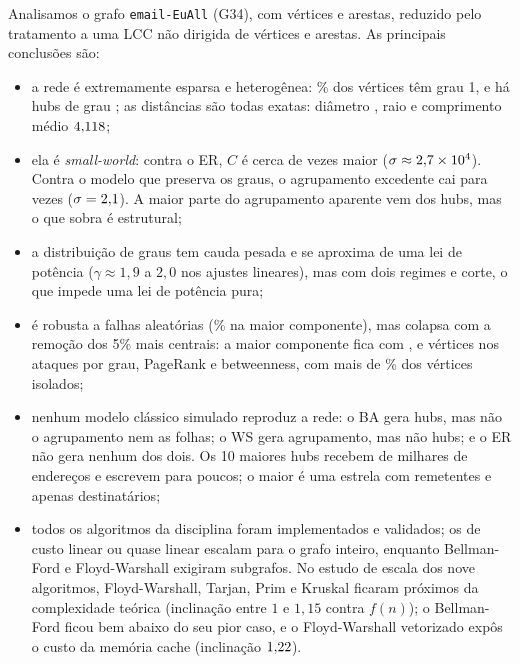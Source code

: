 \documentclass[sigconf]{webmedia}
\begin{document}
Analisamos o grafo \texttt{email-EuAll} (G34), com \nVBruto{} vértices e \nEBruto{} arestas,
reduzido pelo tratamento a uma LCC não dirigida de \nVLcc{} vértices e \nELcc{} arestas.
As principais conclusões são:
\begin{itemize}
  \item a rede é extremamente esparsa e heterogênea: \pctFolhas\% dos vértices têm grau 1,
  e há hubs de grau \grauMax; as distâncias são todas exatas: diâmetro \diametro, raio
  \raio{} e comprimento médio $4{,}118$;
  \item ela é \emph{small-world}: contra o ER, $C$ é cerca de \CsobreCr{} vezes maior
  ($\sigma\approx2{,}7\times10^{4}$). Contra o modelo que preserva os graus, o agrupamento
  excedente cai para \CsobreCconf{} vezes ($\sigma=2{,}1$). A maior parte do
  agrupamento aparente vem dos hubs, mas o que sobra é estrutural;
  \item a distribuição de graus tem cauda pesada e se aproxima de uma lei de potência
  ($\gamma\approx1{,}9$ a $2{,}0$ nos ajustes lineares), mas com dois regimes e corte, o
  que impede uma lei de potência pura;
  \item é robusta a falhas aleatórias (\pctSrand\% na maior componente), mas colapsa com a
  remoção dos 5\% mais centrais: a maior componente fica com \maiorCompGrau, \maiorCompPr{} e \maiorCompBtw{} vértices nos
  ataques por grau, PageRank e betweenness, com mais de \pctIsolMin\% dos vértices isolados;
  \item nenhum modelo clássico simulado reproduz a rede: o BA gera hubs, mas não o
  agrupamento nem as folhas; o WS gera agrupamento, mas não hubs; e o ER não gera nenhum
  dos dois. Os 10 maiores hubs recebem de milhares de endereços e escrevem para poucos;
  o maior é uma estrela com \hubRemetentes{} remetentes e apenas \hubDestinatarios{} destinatários;
  \item todos os algoritmos da disciplina foram implementados e validados; os de custo
  linear ou quase linear escalam para o grafo inteiro, enquanto Bellman-Ford e
  Floyd-Warshall exigiram subgrafos. No estudo de escala dos nove algoritmos,
  Floyd-Warshall, Tarjan, Prim e Kruskal ficaram próximos da complexidade teórica
  (inclinação entre $1$ e $1{,}15$ contra $f(n)$); o Bellman-Ford ficou bem abaixo do seu
  pior caso, e o Floyd-Warshall vetorizado expôs o custo da memória cache (inclinação
  $1{,}22$).
\end{itemize}



\end{document}
